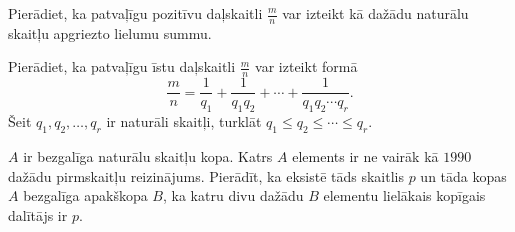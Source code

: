 \documentclass[a4paper,12pt]{article}
\begin{document}
\vspace{10pt}
\begin{problem}
Pierādiet, ka patvaļīgu pozitīvu daļskaitli $\frac{m}{n}$ var izteikt kā dažādu naturālu skaitļu apgriezto lielumu summu.
\end{problem}


\vspace{10pt}
\begin{problem}
Pierādiet, ka patvaļīgu īstu daļskaitli $\frac{m}{n}$ var izteikt formā
$$\frac{m}{n} = \frac{1}{q_1} + \frac{1}{q_1q_2} + \cdots + \frac{1}{q_1q_2\cdots{}q_r}.$$
Šeit $q_1,q_2,\ldots,q_r$ ir naturāli skaitļi, turklāt $q_1 \leq q_2 \leq \cdots \leq q_r$.
\end{problem}


\vspace{10pt}
\begin{problem}
$A$ ir bezgalīga naturālu skaitļu kopa. Katrs $A$ elements ir ne vairāk kā $1990$ 
dažādu pirmskaitļu reizinājums. Pierādīt, ka eksistē tāds skaitlis $p$ un tāda kopas 
$A$ bezgalīga apakškopa $B$, ka katru divu dažādu $B$ elementu lielākais kopīgais dalītājs ir $p$.
\end{problem}
\end{document}

